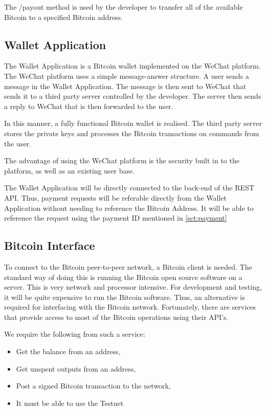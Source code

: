 The /payout method is used by the developer to transfer all of the available Bitcoin to a specified Bitcoin address.

\subsection{Wallet Application}

The Wallet Application is a Bitcoin wallet implemented on the WeChat platform. The WeChat platform uses a simple message-answer structure. A user sends a message in the Wallet Application. The message is then sent to WeChat that sends it to a third party server controlled by the developer. The server then sends a reply to WeChat that is then forwarded to the user. 

In this manner, a fully functional Bitcoin wallet is realised. The third party server stores the private keys and processes the Bitcoin transactions on commands from the user.

The advantage of using the WeChat platform is the security built in to the platform, as well as an existing user base. 

The Wallet Application will be directly connected to the back-end of the REST API. Thus, payment requests will be referable directly from the Wallet Application without needing to reference the Bitcoin Address. It will be able to reference the request using the payment ID mentioned in \ref{sct:payment}

\subsection{Bitcoin Interface}
\label{sct:bitcoin_interface}

To connect to the Bitcoin peer-to-peer network, a Bitcoin client is needed. The standard way of doing this is running the Bitcoin open source software on a server. This is very network and processor intensive. For development and testing, it will be quite expensive to run the Bitcoin software. Thus, an alternative is required for interfacing with the Bitcoin network. Fortunately, there are services that provide access to most of the Bitcoin operations using their API's. 

We require the following from such a service:

\begin{itemize}
	\item Get the balance from an address,
	\item Get unspent outputs from an address,
	\item Post a signed Bitcoin transaction to the network,
	\item It must be able to use the Testnet
\end{itemize}

